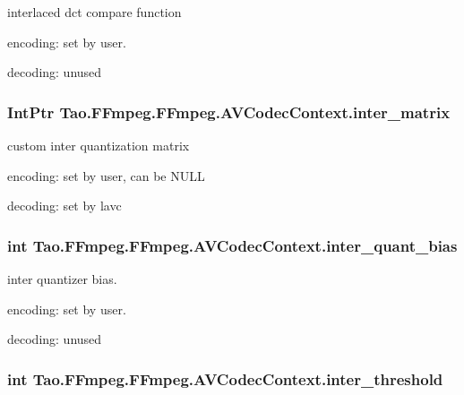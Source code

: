 \label{struct_tao_1_1_f_fmpeg_1_1_f_fmpeg_1_1_a_v_codec_context_aa370704b3271e840ba642cd2121670d5}
interlaced dct compare function
\begin{DoxyItemize}
\item encoding: set by user.
\item decoding: unused 
\end{DoxyItemize}\hypertarget{struct_tao_1_1_f_fmpeg_1_1_f_fmpeg_1_1_a_v_codec_context_aa5a23085fd5be4a206ece31a27c0ff61}{
\subsubsection[{inter\_\-matrix}]{\setlength{\rightskip}{0pt plus 5cm}IntPtr {\bf Tao.FFmpeg.FFmpeg.AVCodecContext.inter\_\-matrix}}}
\label{struct_tao_1_1_f_fmpeg_1_1_f_fmpeg_1_1_a_v_codec_context_aa5a23085fd5be4a206ece31a27c0ff61}
custom inter quantization matrix
\begin{DoxyItemize}
\item encoding: set by user, can be NULL
\item decoding: set by lavc 
\end{DoxyItemize}\hypertarget{struct_tao_1_1_f_fmpeg_1_1_f_fmpeg_1_1_a_v_codec_context_a840cd4c3990fb6c0d56379a55dd246c7}{
\subsubsection[{inter\_\-quant\_\-bias}]{\setlength{\rightskip}{0pt plus 5cm}int {\bf Tao.FFmpeg.FFmpeg.AVCodecContext.inter\_\-quant\_\-bias}}}
\label{struct_tao_1_1_f_fmpeg_1_1_f_fmpeg_1_1_a_v_codec_context_a840cd4c3990fb6c0d56379a55dd246c7}
inter quantizer bias.
\begin{DoxyItemize}
\item encoding: set by user.
\item decoding: unused 
\end{DoxyItemize}\hypertarget{struct_tao_1_1_f_fmpeg_1_1_f_fmpeg_1_1_a_v_codec_context_a86eb266bbe2b30943be9f0583295b32f}{
\subsubsection[{inter\_\-threshold}]{\setlength{\rightskip}{0pt plus 5cm}int {\bf Tao.FFmpeg.FFmpeg.AVCodecContext.inter\_\-threshold}}}
\label{struct_tao_1_1_f_fmpeg_1_1_f_fmpeg_1_1_a_v_codec_context_a86eb266bbe2b30943be9f0583295b32f}

